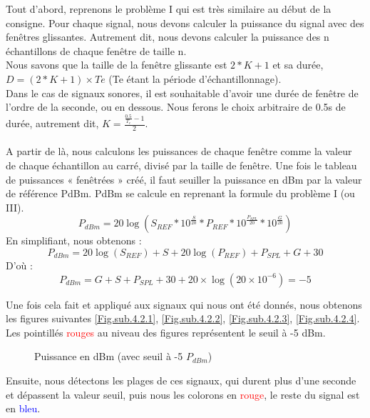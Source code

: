 Tout d’abord, reprenons le problème I qui est très similaire au début de la consigne. Pour chaque signal, nous devons calculer la puissance du signal avec des fenêtres glissantes. Autrement dit, nous devons calculer la puissance des n échantillons de chaque fenêtre de taille n. 
\\
Nous savons que la taille de la fenêtre glissante est $2*K + 1$ et sa durée, $D = (2*K + 1) \times Te $ (Te étant la période d’échantillonnage). 
\\
Dans le cas de signaux sonores, il est souhaitable d’avoir une durée de fenêtre de l’ordre de la seconde, ou en dessous. Nous ferons le choix arbitraire de 0.5s de durée, autrement dit, $K=\frac{\frac{0.5}{T_e}-1}{2}$. 
\\ \\
A partir de là, nous calculons les puissances de chaque fenêtre comme la valeur de chaque échantillon au carré, divisé par la taille de fenêtre. 
Une fois le tableau de puissances « fenêtrées » créé, il faut seuiller la puissance en dBm par la valeur de référence PdBm. PdBm se calcule en reprenant la formule du problème I (ou III). 
\begin{equation}
    P_{dBm} = 20\log(S_{REF}*10^\frac{S}{20}*P_{REF}*10^\frac{P_{SPL}}{20}*10^\frac{G}{20})
\end{equation}
En simplifiant, nous obtenons : 
\begin{equation}
    P_{dBm} = 20\log(S_{REF}) + S + 20\log(P_{REF}) + P_{SPL} + G + 30
\end{equation}
D’où :
\begin{equation}
    P_{dBm} = G + S + P_{SPL} + 30 + 20\times \log(20\times10^{-6}) = -5
\end{equation}

Une fois cela fait et appliqué aux signaux qui nous ont été donnés, nous obtenons les figures suivantes \ref{Fig.sub.4.2.1}, \ref{Fig.sub.4.2.2}, \ref{Fig.sub.4.2.3}, \ref{Fig.sub.4.2.4}. Les pointillés \textcolor{red}{rouges} au niveau des figures représentent le seuil à -5 dBm.

\begin{figure}[htb]
\caption{Puissance en dBm (avec seuil à -5 $P_{dBm}$)}
\label{Fig.main.2}
\end{figure}
Ensuite, nous détectons les plages de ces signaux, qui durent plus d’une seconde et dépassent la valeur seuil, puis nous les colorons en \textcolor{red}{rouge}, le reste du signal est en \textcolor{blue}{bleu}.
